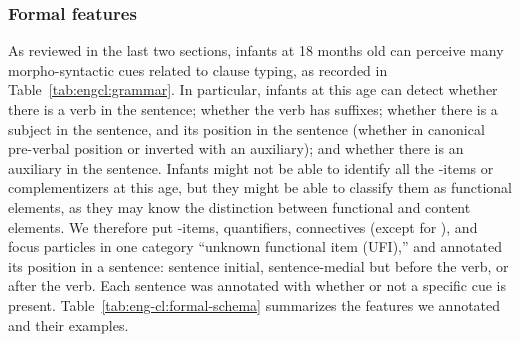 \subsubsection{Formal features}

As reviewed in the last two sections, infants at 18 months old can perceive many morpho-syntactic cues related to clause typing, as recorded in Table~\ref{tab:engcl:grammar}. In particular, infants at this age can detect whether there is a verb in the sentence; whether the verb has suffixes; whether there is a subject in the sentence, and its position in the sentence (whether in canonical pre-verbal position or inverted with an auxiliary); and whether there is an auxiliary in the sentence. Infants might not be able to identify all the \twh-items or complementizers at this age, but they might be able to classify them as functional elements, as they may know the distinction between functional and content elements. We therefore put \twh-items, quantifiers, connectives (except for ), and focus particles in one category ``unknown functional item (UFI),'' and annotated its position in a sentence: sentence initial, sentence-medial but before the verb, or after the verb. Each sentence was annotated with whether or not a specific cue is present. Table~\ref{tab:eng-cl:formal-schema} summarizes the features we annotated and their examples.  


